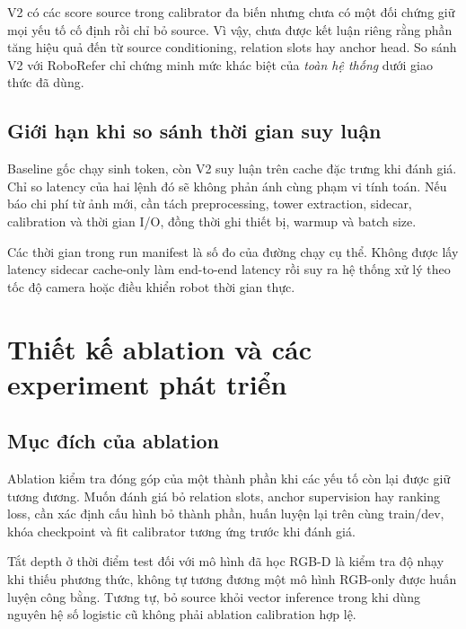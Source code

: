 V2 có các score source trong calibrator đa biến nhưng chưa
có một đối chứng giữ mọi yếu tố cố định rồi chỉ bỏ source.
Vì vậy, chưa được kết luận riêng rằng phần tăng hiệu quả
đến từ source conditioning, relation slots hay anchor head.
So sánh V2 với RoboRefer chỉ chứng minh mức khác biệt của
\emph{toàn hệ thống} dưới giao thức đã dùng.

\subsection{Giới hạn khi so sánh thời gian suy luận}

Baseline gốc chạy sinh token, còn V2 suy luận trên cache
đặc trưng khi đánh giá. Chỉ so latency của hai lệnh đó sẽ
không phản ánh cùng phạm vi tính toán.
Nếu báo chi phí từ ảnh mới, cần tách preprocessing,
tower extraction, sidecar, calibration và thời gian I/O,
đồng thời ghi thiết bị, warmup và batch size.

Các thời gian trong run manifest là số đo của đường chạy
cụ thể. Không được lấy latency sidecar cache-only làm
end-to-end latency rồi suy ra hệ thống xử lý theo tốc độ
camera hoặc điều khiển robot thời gian thực.

\section{Thiết kế ablation và các experiment phát triển}
\label{sec:setup-ablation}

\subsection{Mục đích của ablation}

Ablation kiểm tra đóng góp của một thành phần khi các
yếu tố còn lại được giữ tương đương. Muốn đánh giá bỏ
relation slots, anchor supervision hay ranking loss,
cần xác định cấu hình bỏ thành phần, huấn luyện lại
trên cùng train/dev, khóa checkpoint và fit calibrator
tương ứng trước khi đánh giá.

Tắt depth ở thời điểm test đối với mô hình đã học RGB-D
là kiểm tra độ nhạy khi thiếu phương thức, không tự
tương đương một mô hình RGB-only được huấn luyện công
bằng. Tương tự, bỏ source khỏi vector inference trong
khi dùng nguyên hệ số logistic cũ không phải ablation
calibration hợp lệ.

